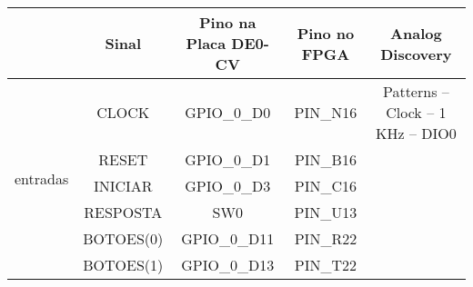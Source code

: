 \documentclass[amsmath,amssymb,floatfix]{report}
\begin{document}
\begin{table}[H]
\centering
\scriptsize
\begin{tabular}{c|c|c|c|c|}
\cline{2-5}
\multicolumn{1}{l|}{\textbf{}}                   & Sinal                   & Pino na Placa DE0-CV & Pino no FPGA                                                                                                                                                                          & Analog Discovery               \\ \hline
\multicolumn{1}{|c|}{\multirow{15}{*}{entradas}} & CLOCK                   & GPIO\_0\_D0          & PIN\_N16                                                                                                                                                                              & Patterns – Clock – 1 KHz – DIO0 \\ \cline{2-5} 
\multicolumn{1}{|c|}{}                           & RESET                   & GPIO\_0\_D1          & PIN\_B16                                                                                                                                                                              &           \\ \cline{2-5} 
\multicolumn{1}{|c|}{}                           & INICIAR                 & GPIO\_0\_D3          & PIN\_C16                                                                                                                                                                              &           \\ \cline{2-5} 
\multicolumn{1}{|c|}{}                           & RESPOSTA                 & SW0          & PIN\_U13                                                                                                                                                                              &                                       \\ \cline{2-5} 
\multicolumn{1}{|c|}{}                           & BOTOES(0)               & GPIO\_0\_D11         & PIN\_R22                                                                                                                                                                              & \multicolumn{1}{l|}{}          \\ \cline{2-5} 
\multicolumn{1}{|c|}{}                           & BOTOES(1)               & GPIO\_0\_D13         & PIN\_T22                                                                                                                                                                              & \multicolumn{1}{l|}{}          \\ \cline{2-5} 

\end{tabular}
\end{table}
\end{document}
